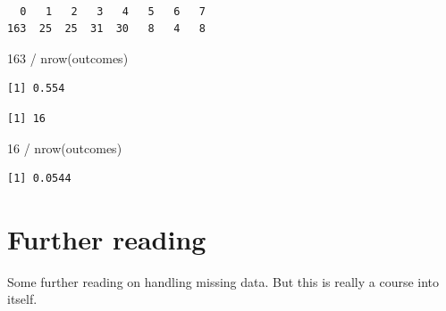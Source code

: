 \documentclass[
  letterpaper,
  DIV=11,
  numbers=noendperiod]{scrreprt}
\newenvironment{Shaded}{}{}
\newcommand{\DecValTok}[1]{\textcolor[rgb]{0.25,0.63,0.44}{#1}}
\newcommand{\DocumentationTok}[1]{\textcolor[rgb]{0.73,0.13,0.13}{\textit{#1}}}
\newcommand{\FunctionTok}[1]{\textcolor[rgb]{0.02,0.16,0.49}{#1}}
\newcommand{\NormalTok}[1]{#1}
\newcommand{\SpecialCharTok}[1]{\textcolor[rgb]{0.25,0.44,0.63}{#1}}
\begin{document}
\begin{Shaded}
\end{Shaded}

\begin{verbatim}

  0   1   2   3   4   5   6   7 
163  25  25  31  30   8   4   8 
\end{verbatim}

\begin{Shaded}
\begin{Highlighting}[]
\DecValTok{163} \SpecialCharTok{/} \FunctionTok{nrow}\NormalTok{(outcomes)}
\end{Highlighting}
\end{Shaded}

\begin{verbatim}
[1] 0.554
\end{verbatim}

\begin{Shaded}
\end{Shaded}

\begin{verbatim}
[1] 16
\end{verbatim}

\begin{Shaded}
\begin{Highlighting}[]
\DecValTok{16} \SpecialCharTok{/} \FunctionTok{nrow}\NormalTok{(outcomes)}
\end{Highlighting}
\end{Shaded}

\begin{verbatim}
[1] 0.0544
\end{verbatim}

\section{Further reading}\label{further-reading}

Some further reading on handling missing data. But this is really a
course into itself.
\end{document}
